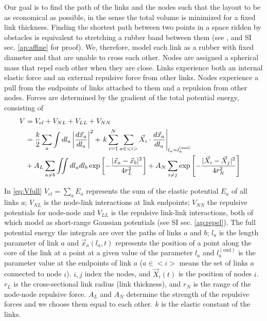 \documentclass[nofootinbib,preprint,floatfix,endfloats]{revtex4} %
\begin{document}
Our goal is to find the path of the links and the nodes such that 
the layout to be as economical as possible, in the sense the total volume is minimized for a fixed link thickness. 
Finding the shortest path between two points in a space ridden by obstacles is equivalent to stretching a rubber band between them (see \cite{novikov1984}, and SI sec. \ref{ap:affine} for proof).
We, therefore, model each link as a rubber with fixed diameter and that are unable to cross each other.%
Nodes are assigned a spherical mass that repel each other when they are close. 
Links experience both an internal elastic force and an external repulsive force from other links. 
Nodes experience a pull from the endpoints of links attached to them and a repulsion from other nodes. 
Forces are determined by the gradient of the total potential energy, consisting of 
\begin{align}
    V &= V_{el} + V_{NL} + V_{LL} +V_{NN} \cr 
    &= {k\over 2}\sum_a\int dl_a \left|{d\vec{x}_a\over dl_a} \right|^2 + 
    \left. k\sum_{i=1}^N  \sum_{a\in <i>}  \vec{X}_i \cdot{d\vec{x}_a%
    \over dl_a}\right|_{l_a = l^{(\mathrm{end})}_a}
    \cr
    &+A_L\sum_{a\ne b} \iint dl_adl_b 
    \exp\left[- {|\vec{x}_a-\vec{x}_b|^2 \over 4 r_L^2}\right] + A_N\sum_{i\ne j}  \exp\left[- {|\vec{X}_i-\vec{X}_j|^2 \over 4r_N^2}\right]
 \label{eq:Vfull}
\end{align}

In \eqref{eq:Vfull} $V_{el}= \sum_a E_a$ represents the sum of the elastic potential $E_a$ of all links $a$; $V_{NL}$
is the node-link interactions at link endpoints;
 $V_{NN}$  the repulsive potentials for node-node and  $V_{LL}$ is the repulsive link-link interactions, both of which model as short-range Gaussian potentials (see SI sec. \ref{ap:repel}). 
The full potential energy
the integrals are over the paths of links $a$ and $b$; $l_a$ is the length parameter of link $a$ and  $\vec{x}_a(l_a,t)$ represents the position of a point along the core of the link at a point at a given value of the parameter $l_a$  and $l_a^\mathrm{(end)}$ is the parameter value at the endpoints of link $a$ ($a\in <i>$ means the set of links $a$ connected to node $i$). $i,j$ index the nodes, and $\vec{X}_i(t)$ is the position of nodes $i$. $r_L$ is the cross-sectional link radius (link thickness), and $r_N$ is the range of the node-node repulsive force. $A_L$ and $A_N$ determine the strength of the repulsive forces and we choose them equal to each other. $k$ is the elastic constant of the links.   
\end{document}

